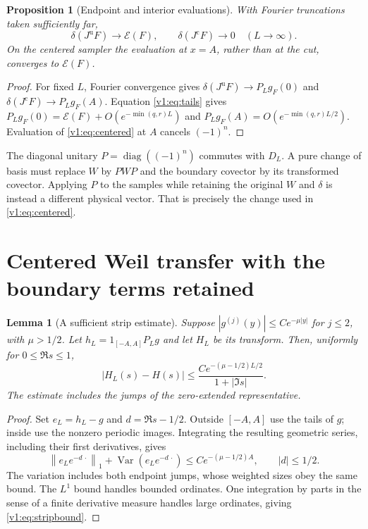 \documentclass[11pt]{article}
\newtheorem{lemma}[theorem]{Lemma}
\newtheorem{proposition}[theorem]{Proposition}
\theoremstyle{remark}
\newcommand{\norm}[1]{\left\lVert #1\right\rVert}
\newcommand{\Jc}{J^{\mathrm c}}
\newcommand{\Ju}{J^{\mathrm u}}
\newcommand{\E}{\mathscr E}
\begin{document}
\begin{proposition}[Endpoint and interior evaluations]\label{v1:prop:endpoints}
With Fourier truncations taken sufficiently far,
\[
 \delta(\Ju F)\longrightarrow \E(F),\qquad
 \delta(\Jc F)\longrightarrow0\quad(L\to\infty).
\]
On the centered sampler the evaluation at $x=A$, rather than at the cut,
converges to $\E(F)$.
\end{proposition}
\begin{proof}
For fixed $L$, Fourier convergence gives
$\delta(\Ju F)\to P_Lg_F(0)$ and
$\delta(\Jc F)\to P_Lg_F(A)$.
Equation \eqref{v1:eq:tails} gives
$P_Lg_F(0)=\E(F)+O(e^{-\min(q,r)L})$ and
$P_Lg_F(A)=O(e^{-\min(q,r)L/2})$.
Evaluation of \eqref{v1:eq:centered} at $A$ cancels $(-1)^n$.
\end{proof}

The diagonal unitary $P=\operatorname{diag}((-1)^n)$ commutes with $D_L$.
A pure change of basis must replace $W$ by $PWP$ and the boundary covector
by its transformed covector. Applying $P$ to the samples while retaining
the original $W$ and $\delta$ is instead a different physical vector.
That is precisely the change used in \eqref{v1:eq:centered}.

\section{Centered Weil transfer with the boundary terms retained}

\begin{lemma}[A sufficient strip estimate]\label{v1:lem:strip}
Suppose $|g^{(j)}(y)|\le C e^{-\mu|y|}$ for $j\le2$, with $\mu>1/2$.
Let $h_L=1_{[-A,A]}P_Lg$ and let $H_L$ be its transform. Then, uniformly
for $0\le\Re s\le1$,
\begin{equation}\label{v1:eq:stripbound}
 |H_L(s)-H(s)|\le
 \frac{C e^{-(\mu-1/2)L/2}}{1+|\Im s|}.
\end{equation}
The estimate includes the jumps of the zero-extended representative.
\end{lemma}
\begin{proof}
Set $e_L=h_L-g$ and $d=\Re s-1/2$.
Outside $[-A,A]$ use the tails of $g$; inside use the nonzero periodic
images. Integrating the resulting geometric series, including their first
derivatives, gives
\[
 \norm{e_L e^{-d\,\cdot}}_1+
 \operatorname{Var}(e_L e^{-d\,\cdot})
 \le C e^{-(\mu-1/2)A},\qquad |d|\le1/2.
\]
The variation includes both endpoint jumps, whose weighted sizes obey
the same bound. The $L^1$ bound handles bounded ordinates. One integration
by parts in the sense of a finite derivative measure handles large
ordinates, giving \eqref{v1:eq:stripbound}.
\end{proof}
\end{document}
